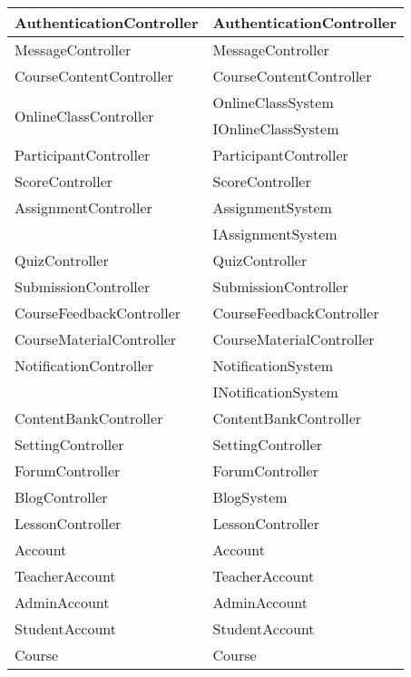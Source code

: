 \documentclass[./../main_file.tex]{subfiles}
\begin{document}
\begin{longtable}{|p{.5\linewidth}|p{.5\linewidth}|}
		AuthenticationController   & AuthenticationController \\ \hline
		MessageController          & MessageController        \\ \hline
		CourseContentController    & CourseContentController  \\ \hline
		\multirow{2}{*}{OnlineClassController}       & OnlineClassSystem                              \\ \cline{2-2} 
		& IOnlineClassSystem       \\ \hline
		ParticipantController      & ParticipantController    \\ \hline
		ScoreController            & ScoreController          \\ \hline
		AssignmentController       & AssignmentSystem         \\ \hline
		& IAssignmentSystem        \\ \hline
		QuizController             & QuizController           \\ \hline
		SubmissionController       & SubmissionController     \\ \hline
		CourseFeedbackController   & CourseFeedbackController \\ \hline
		CourseMaterialController   & CourseMaterialController \\ \hline
		NotificationController     & NotificationSystem       \\ \hline
		& INotificationSystem      \\ \hline
		ContentBankController      & ContentBankController    \\ \hline
		SettingController          & SettingController        \\ \hline
		ForumController            & ForumController          \\ \hline
		BlogController             & BlogSystem               \\ \hline
		LessonController           & LessonController         \\ \hline
		Account                    & Account                  \\ \hline
		TeacherAccount             & TeacherAccount           \\ \hline
		AdminAccount               & AdminAccount             \\ \hline
		StudentAccount             & StudentAccount           \\ \hline
		Course                     & Course                   \\ \hline

\end{longtable}
\end{document}
